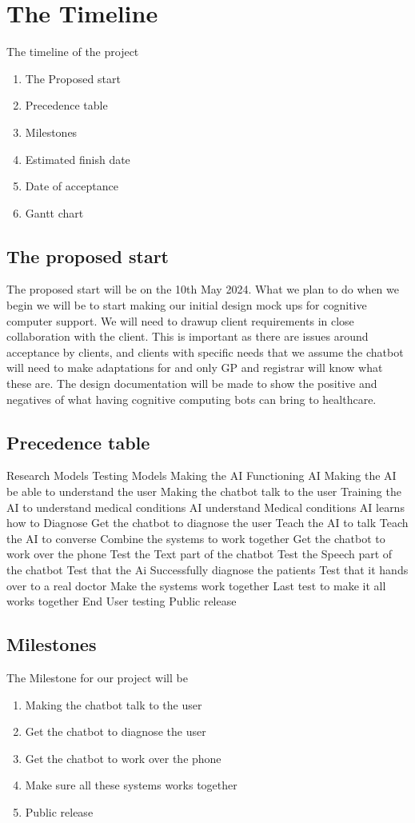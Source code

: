 \documentclass{article}
\begin{document}
\section{The Timeline}
The timeline of the project
\begin{enumerate}
	\item The Proposed start
	\item Precedence table
	\item Milestones
	\item Estimated finish date
	\item Date of acceptance 
	\item Gantt chart
\end{enumerate}

\subsection{The proposed start}
The proposed start will be on the 10th May 2024. What we plan to do when we begin we will be to start making our initial design mock ups for cognitive computer support.
We will need to drawup client requirements in close collaboration with the client. This is important as there are issues around acceptance by clients, and clients with specific needs that we assume the chatbot will need to make adaptations for and only GP and registrar will know what these are.
The design documentation will be made to show the positive and negatives of what having cognitive computing bots can bring to healthcare.

\subsection{Precedence table}
Research Models
Testing Models
Making the AI
Functioning AI
Making the AI be able to understand the user
Making the chatbot talk to the user
Training the AI to understand medical conditions
AI understand Medical conditions
AI learns how to Diagnose
Get the chatbot to diagnose the user
Teach the AI to talk
Teach the AI to converse
Combine the systems to work together 
Get the chatbot to work over the phone
Test the Text part of the chatbot
Test the Speech part of the chatbot
Test that the Ai Successfully diagnose the patients
Test that it hands over to a real doctor
Make the systems work together
Last test to make it all works together
End User testing
Public release 


\subsection{Milestones}
The Milestone for our project will be 
	\begin{enumerate}
		\item Making the chatbot talk to the user
		\item Get the chatbot to diagnose the user
		\item Get the chatbot to work over the phone
		\item Make sure all these systems works together
		\item Public release
	\end{enumerate}
\end{document}
